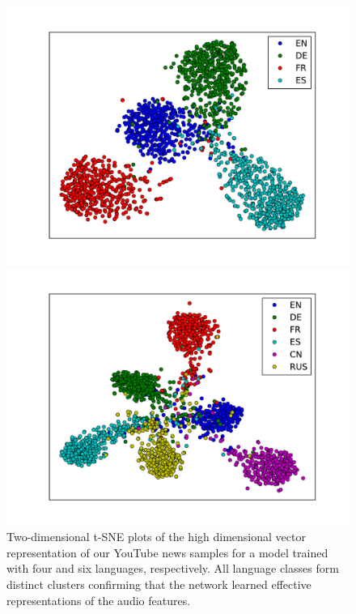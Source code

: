 	\begin{figure}
	\centering
	\begin{minipage}{.5\textwidth}
	  \centering
	  \includegraphics[width=\linewidth]{plots/tsne.pdf}
	\end{minipage}%
	\begin{minipage}{.5\textwidth}
	  \centering
	  \includegraphics[width=\linewidth]{plots/tsne_6lang.pdf}
	\end{minipage}
	\caption{Two-dimensional t-SNE plots of the high dimensional vector representation of our YouTube news samples for a model trained with four and six languages,  respectively. All language classes form distinct clusters confirming that the network learned effective representations of the audio features.}
	\label{fig:tsne}
	\end{figure}

